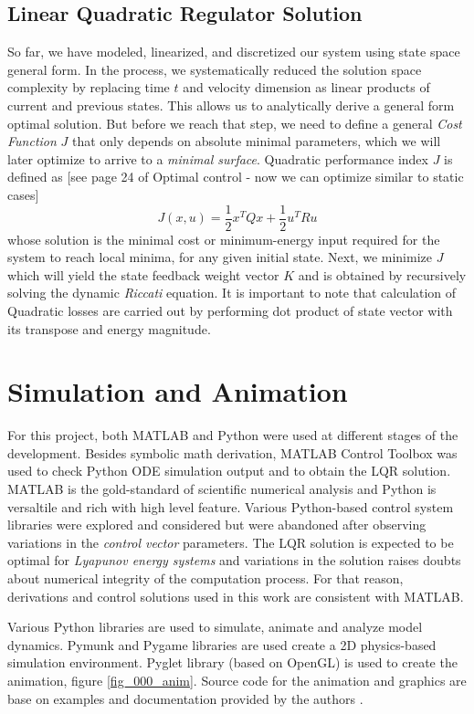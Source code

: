\documentclass[journal]{IEEEtran}
\begin{document}
\subsection{Linear Quadratic Regulator Solution}
So far, we have modeled, linearized, and discretized our system using state
space general form. In the process, we systematically reduced the solution space
complexity by replacing time \(t\) and velocity dimension as linear products of
current and previous states. This allows us to analytically derive a general
form optimal solution. But before we reach that step, we need to define a
general \emph{Cost Function} \(J\) that only depends on absolute minimal parameters,
which we will later optimize to arrive to a \emph{minimal surface}. Quadratic
performance index \(J \) is
defined as [see page 24 of Optimal control - now we can optimize similar to static cases]
\begin{equation}
J(x,u) = \frac{1}{2}x^{T}Q x + \frac{1}{2}u^{T}Ru
\end{equation}
whose solution is the minimal cost or minimum-energy input required for the
system to reach local minima, for any given initial state. Next, we minimize \(J\)
which will yield the state feedback weight vector \(K\) and is obtained by
recursively solving the dynamic \emph{Riccati} equation.
It is important to note that calculation of Quadratic losses are carried out by
performing dot product of state vector with its transpose and energy magnitude.


\section{Simulation and Animation}
For this project, both MATLAB and Python were used at different stages of the
development. Besides symbolic math derivation, MATLAB Control Toolbox was used
to check Python ODE simulation output and to obtain the LQR solution. MATLAB is
the gold-standard of scientific numerical analysis and Python is versaltile and
rich with high level feature. Various Python-based control system libraries were
explored and considered but were abandoned after observing variations in the
\emph{control vector} parameters. The LQR solution is expected to be optimal for
\emph{Lyapunov energy systems} and variations in the solution raises doubts
about numerical integrity of the computation process. For that reason, derivations
and control solutions used in this work are consistent with MATLAB.

Various Python libraries are used to simulate, animate and analyze model dynamics.
Pymunk and Pygame libraries are used create a 2D physics-based simulation
environment. Pyglet library (based on OpenGL) is used to create the animation,
figure \ref{fig_000_anim}. Source code for the animation and graphics are base
on examples and documentation provided by the authors \cite{pymunk}.
\end{document}
